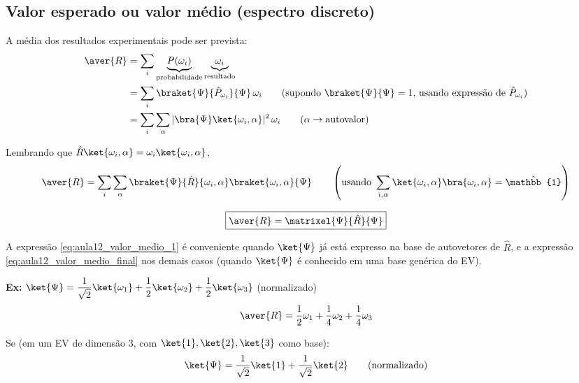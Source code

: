 \subsection*{Valor esperado ou valor médio (espectro discreto)}

A média dos resultados experimentais pode ser prevista:
\begin{align}
    \aver{R} &= \sum_i \underbrace{P(\omega_i)}_{\text{probabilidade}} \underbrace{\omega_i}_{\text{resultado}} \notag\\
    &= \sum_i \braket{\Psi}{\hat{P}_{\omega_i}}{\Psi}\, \omega_i \qquad \text{(supondo } \braket{\Psi}{\Psi}=1 \text{, usando expressão de } \hat{P}_{\omega_i}\text{)} \notag \\
    &= \sum_i \sum_\alpha |\bra{\Psi}\ket{\omega_i,\alpha}|^2\, \omega_i \qquad (\alpha \to \text{autovalor}) \label{eq:aula12_valor_medio_1}
\end{align}

Lembrando que $\hat{R}\ket{\omega_i,\alpha} = \omega_i\ket{\omega_i,\alpha}$,
\begin{equation}
    \aver{R} = \sum_i \sum_\alpha \braket{\Psi}{\hat{R}}{\omega_i,\alpha}\braket{\omega_i,\alpha}{\Psi} \qquad \left(\text{usando } \sum_{i,\alpha} \ket{\omega_i,\alpha}\bra{\omega_i,\alpha} = \hat{\mathbb{1}}\right)
\label{eq:aula12_valor_medio_2}
\end{equation}

\begin{equation}
    \boxed{\aver{R} = \matrixel{\Psi}{\hat{R}}{\Psi}}
\label{eq:aula12_valor_medio_final}
\end{equation}

A expressão \eqref{eq:aula12_valor_medio_1} é conveniente quando $\ket{\Psi}$ já está expresso na base de autovetores de $\hat{R}$, e a expressão \eqref{eq:aula12_valor_medio_final} nos demais casos (quando $\ket{\Psi}$ é conhecido em uma base genérica do EV).

\textbf{Ex:} $\ket{\Psi} = \dfrac{1}{\sqrt{2}}\ket{\omega_1} + \dfrac{1}{2}\ket{\omega_2} + \dfrac{1}{2}\ket{\omega_3}$ (normalizado)
\begin{equation}
    \aver{R} = \frac{1}{2}\omega_1 + \frac{1}{4}\omega_2 + \frac{1}{4}\omega_3
\label{eq:aula12_exemplo_discreto}
\end{equation}

Se (em um EV de dimensão 3, com $\ket{1}, \ket{2}, \ket{3}$ como base):
\begin{equation}
    \ket{\Psi} = \frac{1}{\sqrt{2}}\ket{1} + \frac{1}{\sqrt{2}}\ket{2} \qquad \text{(normalizado)}
\label{eq:aula12_exemplo_base_generica}
\end{equation}

